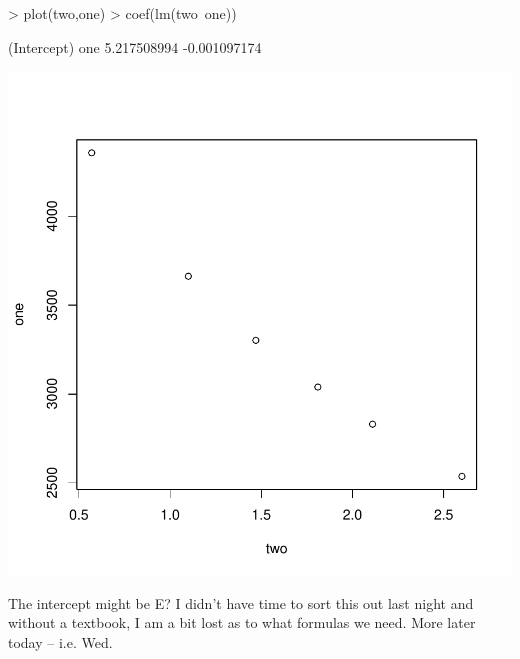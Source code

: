 \documentclass{article}
\begin{document}
\begin{Schunk}
\begin{Sinput}
> plot(two,one)
> coef(lm(two~one))
\end{Sinput}
\begin{Soutput}
 (Intercept)          one 
 5.217508994 -0.001097174 
\end{Soutput}
\end{Schunk}
\includegraphics{Chemistry1-004}

The intercept might be E?  I didn't have time to sort this out last night and without a textbook, I am a bit lost as to what formulas we need. More later today -- i.e. Wed.
\end{document}

